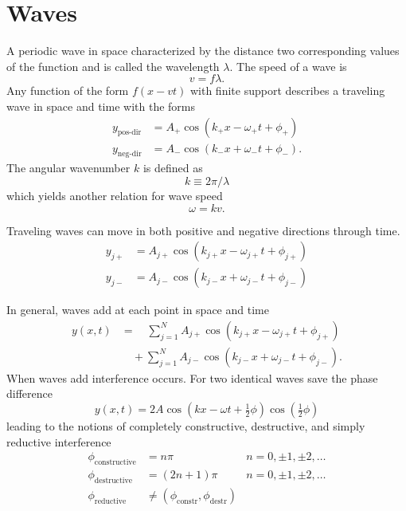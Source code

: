 \section{Waves}

A periodic wave in space characterized by the distance two corresponding
values of the function and is called the wavelength $\lambda$.  The speed
of a wave is
\begin{equation*}
  v = f \lambda.
\end{equation*}
Any function of the form $f(x-vt)$ with finite support describes a
traveling wave in space and time with the forms
\begin{align*}
  y_{\text{pos-dir}} &= A_{+}\cos(k_{+}x - \omega_{+}t + \phi_{+})\\
  y_{\text{neg-dir}} &= A_{-}\cos(k_{-}x + \omega_{-}t + \phi_{-}).
\end{align*}
The angular wavenumber $k$ is defined as
\begin{equation*}
  k \equiv 2\pi / \lambda
\end{equation*}
which yields another relation for wave speed
\begin{equation*}
  \omega = kv.
\end{equation*}

Traveling waves can move in both positive and negative directions through time.
\begin{align*}
  y_{j+} &= A_{j+}\cos(k_{j+}x - \omega_{j+}t + \phi_{j+})\\
  y_{j-} &= A_{j-}\cos(k_{j-}x + \omega_{j-}t + \phi_{j-})
\end{align*}


In general, waves add at each point in space and time
\begin{align*}
  y(x,t) &= \quad\sum_{j=1}^N %
    A_{j+}\cos(k_{j+}x - \omega_{j+}t + \phi_{j+})%
    \\
  &\quad + \sum_{j=1}^N %
    A_{j-}\cos(k_{j-}x + \omega_{j-}t + \phi_{j-}).
\end{align*}
When waves add interference occurs.  For two identical waves save the phase
difference
\begin{equation*}
  y(x,t) = 2A\cos(kx-\omega t + \tfrac{1}{2}\phi) \cos(\tfrac{1}{2}\phi)
\end{equation*}
leading to the notions of completely constructive, destructive, and simply
reductive interference
\begin{align*}
  \phi_{\text{constructive}} &= n\pi & n= 0, \pm 1, \pm 2, \dotsc\\%
  \phi_{\text{destructive}} &= (2n+1)\pi & n= 0, \pm 1, \pm 2, \dotsc\\%
  \phi_{\text{reductive}} &\neq ( \phi_{\text{constr}}, \phi_{\text{destr}})
\end{align*}
